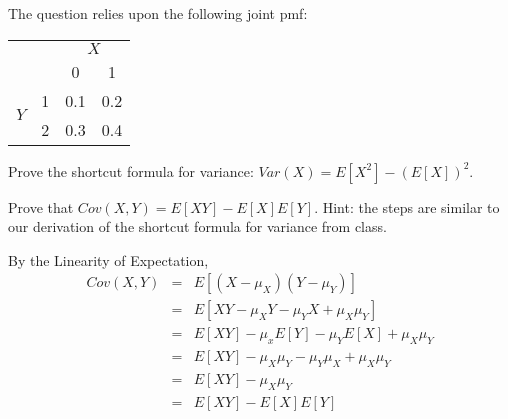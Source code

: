 \documentclass[addpoints,12pt]{exam}
\begin{document}
\begin{questions}

\question The question relies upon the following joint pmf: 
			\begin{center}
\begin{tabular}{|cc|cc|}
\hline
&&\multicolumn{2}{c|}{$X$}\\
&&0 & 1\\
\hline
\multirow{2}{*}{$Y$}
&1& \multicolumn{1}{|c}{0.1} & 0.2\\
&2& \multicolumn{1}{|c}{0.3} & 0.4\\
\hline
\end{tabular}
\end{center}

\question Prove the shortcut formula for variance: $Var(X) = E[X^2] - \left( E[X] \right)^2$.

\question Prove that $Cov(X,Y) = E[XY] - E[X]E[Y]$. Hint: the steps are similar to our derivation of the shortcut formula for variance from class.
	\begin{solution}
	By the Linearity of Expectation,
	\begin{eqnarray*}
	Cov(X,Y)&=& E[(X - \mu_X)(Y-\mu_Y)]\\
			&=& E[XY - \mu_X Y - \mu_Y X + \mu_X \mu_Y]\\
			&=&E[XY] - \mu_xE[Y] - \mu_Y E[X] + \mu_X \mu_Y\\
			&=& E[XY] - \mu_X\mu_Y - \mu_Y\mu_X + \mu_X \mu_Y\\
			&=& E[XY] - \mu_X \mu_Y\\
			&=& E[XY] - E[X]E[Y]
\end{eqnarray*}
\end{solution}


\end{questions}
\end{document}
